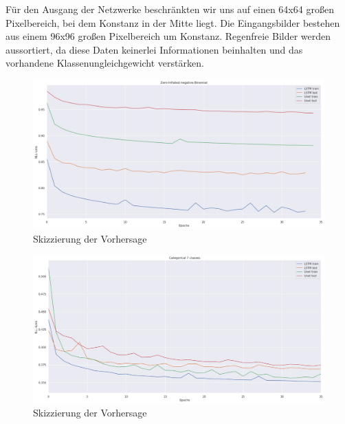 \noindent Für den Ausgang der Netzwerke beschränkten wir uns auf einen 64x64 großen Pixelbereich, bei dem Konstanz in der Mitte liegt. Die Eingangsbilder bestehen aus einem 96x96 großen Pixelbereich um Konstanz. Regenfreie Bilder werden aussortiert, da diese Daten keinerlei Informationen beinhalten und das vorhandene Klassenungleichgewicht verstärken.




\begin{figure}[htb]
 \centering
 \includegraphics[width=1.0\textwidth,angle=0]{abb/Loss_zinfBinom.png}
 \caption{Skizzierung der Vorhersage}
\label{fig:Vorhersage_skizze}
\end{figure}

\begin{figure}[htb]
 \centering
 \includegraphics[width=1.0\textwidth,angle=0]{abb/Categorical.png}
 \caption{Skizzierung der Vorhersage}
\label{fig:Vorhersage_skizze}
\end{figure}


